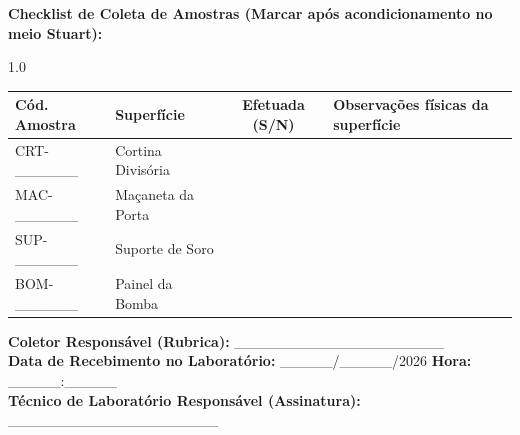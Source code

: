 \documentclass[12pt,a4paper]{article}
\begin{document}
\vspace{12pt}
\noindent \textbf{Checklist de Coleta de Amostras (Marcar após acondicionamento no meio Stuart):}

\begin{spacing}{1.0}
\begin{longtable}{|l|l|c|p{6.5cm}|}
\hline
\textbf{Cód. Amostra} & \textbf{Superfície} & \textbf{Efetuada (S/N)} & \textbf{Observações físicas da superfície} \\
\hline
CRT-\_\_\_\_\_\_ & Cortina Divisória & & \\
\hline
MAC-\_\_\_\_\_\_ & Maçaneta da Porta & & \\
\hline
SUP-\_\_\_\_\_\_ & Suporte de Soro & & \\
\hline
BOM-\_\_\_\_\_\_ & Painel da Bomba & & \\
\hline
\end{longtable}
\end{spacing}

\vspace{12pt}
\noindent \textbf{Coletor Responsável (Rubrica):} \_\_\_\_\_\_\_\_\_\_\_\_\_\_\_\_\_\_\_\_ \\
\textbf{Data de Recebimento no Laboratório:} \_\_\_\_\_/\_\_\_\_\_/2026 \hfill \textbf{Hora:} \_\_\_\_\_:\_\_\_\_\_ \\
\textbf{Técnico de Laboratório Responsável (Assinatura):} \_\_\_\_\_\_\_\_\_\_\_\_\_\_\_\_\_\_\_\_
\end{document}
